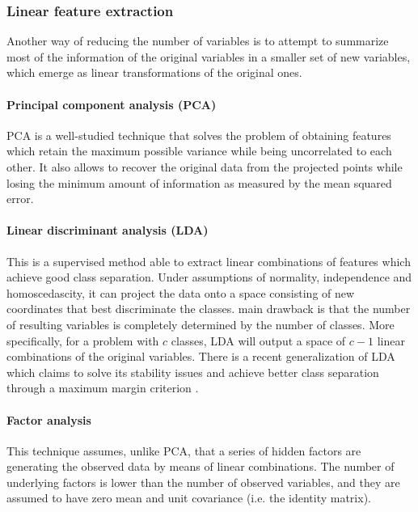 \subsubsection{Linear feature extraction}

Another way of reducing the number of variables is to attempt to summarize most of the information of the original variables in a smaller set of new variables, which emerge as linear transformations of the original ones.

\paragraph*{Principal component analysis (PCA) \cite{PCA,PCABook}} PCA  is a well-studied technique that solves the problem of obtaining features which retain the maximum possible variance while being uncorrelated to each other. It also allows to recover the original data from the projected points while losing the minimum amount of information as measured by the mean squared error. %

\paragraph*{Linear discriminant analysis (LDA) \cite{LDA}} This is a supervised method able to extract linear combinations of features which achieve good class separation. Under assumptions of normality, independence and homoscedascity, it can project the data onto a space consisting of new coordinates that best discriminate the classes.  main drawback is that the number of resulting variables is completely determined by the number of classes. More specifically, for a problem with $c$ classes, LDA will output a space of $c-1$ linear combinations of the original variables. There is a recent generalization of LDA which claims to solve its stability issues and achieve better class separation through a maximum margin criterion \cite{li2006efficient}.

\paragraph*{Factor analysis \cite{PCAandFA}} This technique assumes, unlike PCA, that a series of hidden factors are generating the observed data by means of linear combinations. The number of underlying factors is lower than the number of observed variables, and they are assumed to have zero mean and unit covariance (i.e. the identity matrix). %

